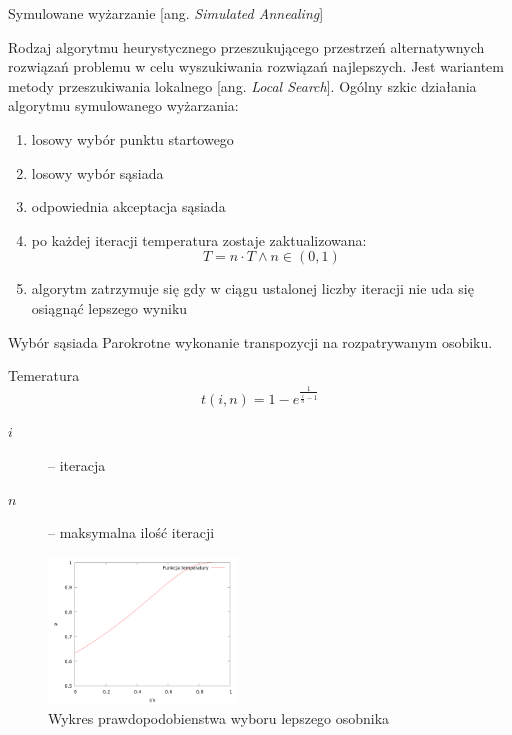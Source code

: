 \begin{frame}{Symulowane wyżarzanie [ang. \textit{Simulated Annealing}]}

	\begin{block}{}
	Rodzaj algorytmu heurystycznego przeszukującego przestrzeń alternatywnych rozwiązań problemu w celu wyszukiwania rozwiązań najlepszych. Jest wariantem metody przeszukiwania lokalnego [ang. \textit{Local Search}].
	Ogólny szkic działania algorytmu symulowanego wyżarzania:
	\end{block}
	\begin{enumerate}
		\item losowy wybór punktu startowego
		\item losowy wybór sąsiada
		\item odpowiednia akceptacja sąsiada
		\item po każdej iteracji temperatura zostaje zaktualizowana:
			$$ T = n\cdot T \wedge n \in (0,1)$$
		\item algorytm zatrzymuje się gdy w ciągu ustalonej liczby iteracji nie uda się osiągnąć lepszego wyniku
	\end{enumerate}

    \begin{block}{Wybór sąsiada}
        Parokrotne wykonanie transpozycji na rozpatrywanym osobiku.
    \end{block}
\end{frame}

\begin{frame}{Temeratura}
    \begin{equation}
        t(i, n) = 1 - e^\frac{1}{\frac{i}{n} - 1}
    \end{equation}

    \begin{description}
        \item[$i$] -- iteracja
        \item[$n$] -- maksymalna ilość iteracji
    \end{description}

    \begin{figure}
        \centering
        \includegraphics[width=5cm]{charts/temp.png}
        \caption{Wykres prawdopodobienstwa wyboru lepszego osobnika}
    \end{figure}
\end{frame}

